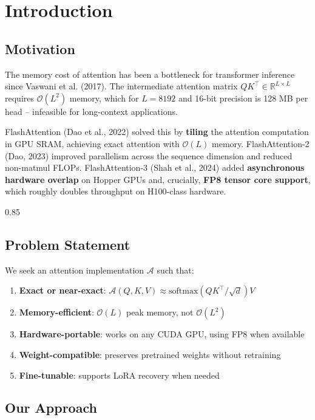 
\section{Introduction}

\subsection{Motivation}

The memory cost of attention has been a bottleneck for transformer inference 
since Vaswani et al. (2017). The intermediate attention matrix $Q K^\top \in 
\mathbb{R}^{L \times L}$ requires $\mathcal{O}(L^2)$ memory, which for 
$L = 8192$ and 16-bit precision is 128 MB per head -- infeasible for 
long-context applications.

FlashAttention (Dao et al., 2022) solved this by \textbf{tiling} the attention 
computation in GPU SRAM, achieving exact attention with $\mathcal{O}(L)$ 
memory. FlashAttention-2 (Dao, 2023) improved parallelism across the sequence 
dimension and reduced non-matmul FLOPs. FlashAttention-3 (Shah et al., 2024) 
added \textbf{asynchronous hardware overlap} on Hopper GPUs and, crucially, 
\textbf{FP8 tensor core support}, which roughly doubles throughput on H100-class 
hardware.

0.85


\subsection{Problem Statement}

We seek an attention implementation $\mathcal{A}$ such that:

\begin{enumerate}
\item \textbf{Exact or near-exact}: $\mathcal{A}(Q, K, V) \approx \text{softmax}(QK^\top/\sqrt{d})V$
\item \textbf{Memory-efficient}: $\mathcal{O}(L)$ peak memory, not $\mathcal{O}(L^2)$
\item \textbf{Hardware-portable}: works on any CUDA GPU, using FP8 when available
\item \textbf{Weight-compatible}: preserves pretrained weights without retraining
\item \textbf{Fine-tunable}: supports LoRA recovery when needed

\end{enumerate}
\subsection{Our Approach}

